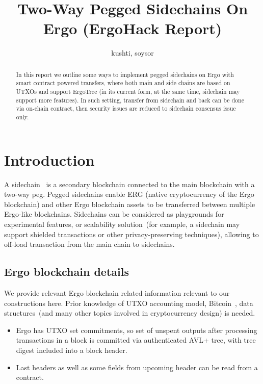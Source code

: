 \documentclass{article}   %
\begin{document}
\title{Two-Way Pegged Sidechains On Ergo (ErgoHack Report)}
\author{kushti, soysor}


\maketitle

\begin{abstract}
In this report we outline some ways to implement pegged sidechains on Ergo with smart contract powered transfers, where both main and
  side chains are based on UTXOs and support ErgoTree (in its current form, at the same time, sidechain may support more features).
In such setting, transfer from sidechain and back can be done via on-chain contract, then security issues are reduced to
  sidechain consensus issue only.
\end{abstract}


\section{Introduction}

A sidechain~\cite{back2014enabling} is a secondary blockchain connected to the main blockchain with a two-way peg.
Pegged sidechains enable ERG (native cryptocurrency of the Ergo blockchain) and other Ergo blockchain assets to be
transferred between multiple Ergo-like blockchains. Sidechains can be considered as playgrounds for experimental features,
or scalability solution~(for example, a sidechain may support shielded transactions or other privacy-preserving
techniques), allowing to off-load transaction from the main chain to sidechains.

\subsection{Ergo blockchain details}

We provide relevant Ergo blockchain related information relevant to our constructions here. Prior knowledge of UTXO
accounting model, Bitcoin~\cite{nakamoto2009}, data structures~(and many other topics involved in cryptocurrency design) is needed.
\begin{itemize}
\item{} Ergo has UTXO set commitments, so set of unspent outputs after processing transactions in a block is committed via
authenticated AVL+ tree, with tree digest included into a block header.
\item{} Last headers as well as some fields from upcoming header can be read from a contract.
\end{itemize}
\end{document}
